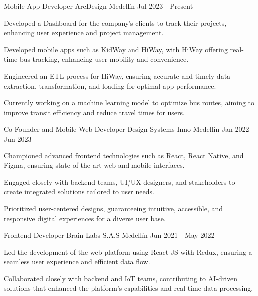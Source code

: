 \begin{cventries}
{}
\cventry
{Mobile App Developer} %
{ArcDesign} %
{Medellín} %
{Jul 2023 - Present} %
{
  \begin{cvitems} %
    \item {Developed a Dashboard for the company's clients to track their projects, enhancing user experience and project management.}
    \item {Developed mobile apps such as KidWay and HiWay, with HiWay offering real-time bus tracking, enhancing user mobility and convenience.}
    \item {Engineered an ETL process for HiWay, ensuring accurate and timely data extraction, transformation, and loading for optimal app performance.}
    \item {Currently working on a machine learning model to optimize bus routes, aiming to improve transit efficiency and reduce travel times for users.}
  \end{cvitems}
}
\cventry
{Co-Founder and Mobile-Web Developer} %
{Design Systems Inno} %
{Medellín} %
{Jan 2022 - Jun 2023} %
{
  \begin{cvitems} %
    \item {Championed advanced frontend technologies such as React, React Native, and Figma, ensuring state-of-the-art web and mobile interfaces.}
    \item {Engaged closely with backend teams, UI/UX designers, and stakeholders to create integrated solutions tailored to user needs.}
    \item {Prioritized user-centered designs, guaranteeing intuitive, accessible, and responsive digital experiences for a diverse user base.}
  \end{cvitems}
}
\cventry
{Frontend Developer} %
{Brain Labs S.A.S} %
{Medellín} %
{Jun 2021 - May 2022} %
{
  \begin{cvitems} %
    \item {Led the development of the web platform using React JS with Redux, ensuring a seamless user experience and efficient data flow.}
    \item {Collaborated closely with backend and IoT teams, contributing to AI-driven solutions that enhanced the platform's capabilities and real-time data processing.}
  \end{cvitems}
}
\end{cventries}